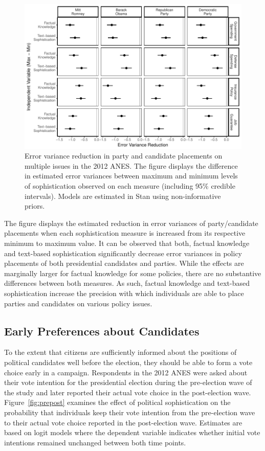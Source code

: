 \documentclass[12pt]{article}
\begin{document}
\begin{figure}[h]\centering
\includegraphics{../fig/hetreg.pdf}
\caption{Error variance reduction in party and candidate placements on multiple issues in the 2012 ANES. The figure displays the difference in estimated error variances between maximum and minimum levels of sophistication observed on each measure (including 95\% credible intervals). Models are estimated in Stan using non-informative priors.}\label{fig:hetreg}
\end{figure}

The figure displays the estimated reduction in error variances of party/candidate placements when each sophistication measure is increased from its respective minimum to maximum value. It can be observed that both, factual knowledge and text-based sophistication significantly decrease error variances in policy placements of both presidential candidates and parties. While the effects are marginally larger for factual knowledge for some policies, there are no substantive differences between both measures. As such, factual knowledge and text-based sophistication increase the precision with which individuals are able to place parties and candidates on various policy issues.


\subsection*{Early Preferences about Candidates}

To the extent that citizens are sufficiently informed about the positions of political candidates well before the election, they should be able to form a vote choice early in a campaign. Respondents in the 2012 ANES were asked about their vote intention for the presidential election during the pre-election wave of the study and later reported their actual vote choice in the post-election wave. Figure~\ref{fig:prepost} examines the effect of political sophistication on the probability that individuals keep their vote intention from the pre-election wave to their actual vote choice reported in the post-election wave. Estimates are based on logit models where the dependent variable indicates whether initial vote intentions remained unchanged between both time points.
\end{document}
